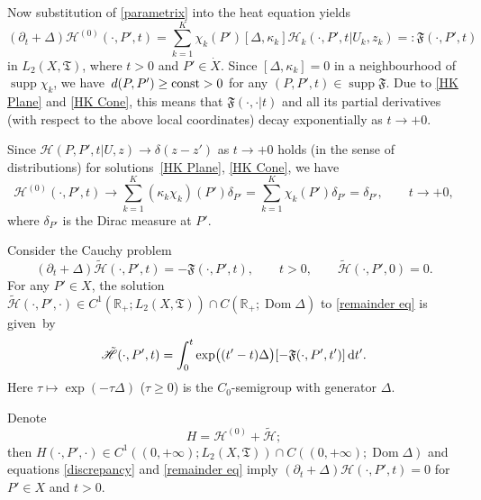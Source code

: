 \documentclass[pdftex]{sigma}
\numberwithin{equation}{section}
\theoremstyle{definition}
\begin{document}
Now substitution of \eqref{parametrix} into the heat equation yields
\begin{equation}
\label{discrepancy}
(\partial_t +\Delta)\mathscr{H}^{(0)}(\cdot,P',t)=\sum_{k=1}^K\chi_k(P') [\Delta,\kappa_k]\mathcal{H}_k(\cdot,P',t|U_k,z_k)=:\mathfrak{F}(\cdot,P',t)
\end{equation}
in $L_2(X,\mathfrak{T})$, where $t>0$ and $P'\in\dot{X}$. Since $[\Delta,\kappa_k]=0$ in a neighbourhood of $\operatorname{supp}\chi_k$, we have~${d(P,P')\ge {\rm const}>0}$ for any $(P,P',t)\in \operatorname{supp}\mathfrak{F}$. Due to \eqref{HK Plane} and \eqref{HK Cone}, this means that $\mathfrak{F}(\cdot,\cdot|t)$ and all its partial derivatives (with respect to the above local coordinates) decay exponentially as $t\to +0$.

Since $\mathcal{H}(P,P',t|U,z)\to\delta(z-z')$ as $t\to +0$ holds (in the sense of distributions) for solutions~\eqref{HK Plane}, \eqref{HK Cone}, we have
\begin{equation}
\label{delta convergence}
\mathscr{H}^{(0)}(\cdot,P',t)\to \sum_{k=1}^K(\kappa_k\chi_k)(P')\delta_{P'}=\sum_{k=1}^K\chi_k(P')\delta_{P'}=\delta_{P'}, \qquad t\to+0,
\end{equation}
where $\delta_{P'}$ is the Dirac measure at $P'$.

Consider the Cauchy problem
\begin{equation}
\label{remainder eq}
(\partial_t +\Delta)\tilde{\mathscr{H}}(\cdot,P',t)=-\mathfrak{F}(\cdot,P',t), \qquad t>0, \qquad \tilde{\mathscr{H}}(\cdot,P',0)=0.
\end{equation}
For any $P'\in X$, the solution $\tilde{\mathscr{H}}(\cdot,P',\cdot)\in C^{1}(\mathbb{R}_+;L_2(X,\mathfrak{T}))\cap C(\mathbb{R}_+;\operatorname{Dom}\Delta)$ to \eqref{remainder eq}
is given~by
\begin{gather}
\label{remainder hk}
\tilde{\mathscr{H}}(\cdot,P',t)=\int_0^t\exp\bigl((t'-t)\Delta\bigr)[-\mathfrak{F}(\cdot,P',t')]\,{\rm d}t'.
\end{gather}
Here $\tau\mapsto \exp(-\tau\Delta)$ ($\tau\ge 0$) is the $C_0$-semigroup with generator $\Delta$.

Denote
\begin{equation}
\label{heat kernel}
H=\mathscr{H}^{(0)}+\tilde{\mathscr{H}};
\end{equation}
then $H(\cdot,P',\cdot)\in C^{1}((0,+\infty);L_2(X,\mathfrak{T}))\cap C((0,+\infty);\operatorname{Dom}\Delta)$ and equations \eqref{discrepancy} and \eqref{remainder eq} imply $(\partial_t +\Delta)\mathscr{H}(\cdot,P',t)=0$ for $P'\in X$ and $t>0$.
\end{document}
